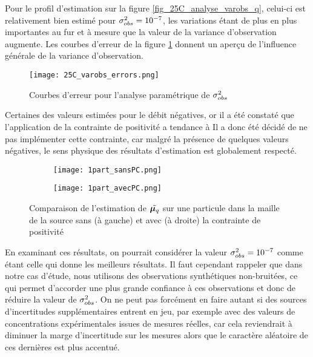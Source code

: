          Pour le profil d'estimation  sur la figure \ref{fig_25C_analyse_varobs_q}, celui-ci est relativement bien estimé pour ${\sigma_{obs}^2}=10^{-7}$, les variations étant de plus en plus importantes au fur et à mesure que la valeur de la variance d'observation augmente. Les courbes d'erreur de la figure \ref{fig_25C_varobs_erreurs} donnent un aperçu de l'influence générale de la variance d'observation.
         
         \begin{figure}[h!]
         	\centering
         	\texttt{[image: 25C\_varobs\_errors.png]}
         	\caption{Courbes d'erreur pour l'analyse paramétrique de ${\sigma_{obs}^2}$}
         	\label{fig_25C_varobs_erreurs}
         \end{figure}
         
         
         Certaines des valeurs estimées pour le débit  négatives, or il a été constaté que l'application de la contrainte de positivité a tendance à  Il a donc été décidé de ne pas implémenter cette contrainte, car malgré la présence de quelques valeurs négatives, le sens physique des résultats d'estimation est globalement respecté.
       
\begin{figure}[h!]
    	\centering
         	\begin{subfigure}[t]{0.5\textwidth}
         		\centering
         		\texttt{[image: 1part\_sansPC.png]}
         		\caption{}
         		\label{sansPC}
         	\end{subfigure}%
         	\begin{subfigure}[t]{0.5\textwidth}
         		\centering
         		\texttt{[image: 1part\_avecPC.png]}
         		\caption{}
         		\label{avecPC}
         	\end{subfigure}
         	\caption{Comparaison de l'estimation de $\tilde{{\bm{\mu}_q}}$ sur une particule dans la maille de la source sans (à gauche) et avec (à droite) la contrainte de positivité}
         	\label{fig_sansavecPC}
         \end{figure}

En examinant ces résultats, on pourrait considérer la valeur ${\sigma_{obs}^2} = 10^{-7}$ comme étant celle qui donne les meilleurs résultats. Il faut cependant rappeler que dans notre cas d'étude, nous utilisons des observations synthétiques non-bruitées, ce qui permet d'accorder une plus grande confiance à ces observations et donc de réduire la valeur de ${\sigma_{obs}^2}$. On ne peut pas forcément en faire autant si des sources d'incertitudes supplémentaires entrent en jeu, par exemple avec des valeurs de concentrations expérimentales issues de mesures réelles, car cela reviendrait à diminuer la marge d'incertitude sur les mesures alors que le caractère aléatoire de ces dernières est plus accentué. 

